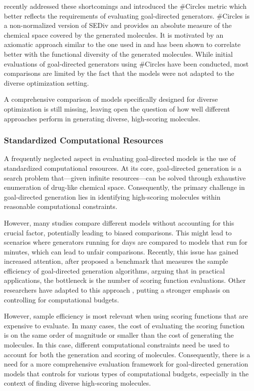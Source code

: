 \citet{xieHowMuchSpace2023} recently addressed these shortcomings and introduced the \#Circles
metric which better reflects the requirements of evaluating goal-directed generators. \#Circles is a
non-normalized version of \ac{SEDiv} and provides an absolute measure of the chemical space covered by
the generated molecules. It is motivated by an axiomatic approach similar to the one used in
\citep{waldmanNovelAlgorithmsOptimization2000} and has been shown to correlate better with the
functional diversity of the generated molecules. While initial evaluations of goal-directed generators using \#Circles have been conducted, most comparisons are limited by the
fact that the models were not adapted to the diverse optimization setting.

A comprehensive
comparison of models specifically designed for diverse optimization is still missing, leaving open
the question of how well different approaches perform in generating diverse, high-scoring molecules.

\subsubsection{Standardized Computational Resources}
A frequently neglected aspect in evaluating goal-directed models is the use of standardized
computational resources. At its core, goal-directed generation is a search problem
that—given infinite resources—can be solved through exhaustive enumeration of drug-like chemical space.
Consequently, the primary challenge in goal-directed generation lies in identifying high-scoring molecules
within reasonable computational constraints.

However, many studies compare different models without accounting for this crucial factor,
potentially leading to biased comparisons. This might lead to scenarios where generators running for
days are compared to models that run for minutes, which can lead to unfair comparisons. Recently,
this issue has gained increased attention, after \citep{gaoSampleEfficiencyMatters2022} proposed a
benchmark that measures the sample efficiency of goal-directed generation algorithms, arguing
that in practical applications, the bottleneck is the number of scoring function evaluations. Other
researchers have adapted to this approach \citep{thomasReevaluatingSampleEfficiency2022,thomasAugmentedHillClimbIncreases2022,guoAugmentedMemoryCapitalizing2023},
putting a stronger emphasis on controlling for computational budgets.

However, sample efficiency is most relevant when using scoring functions that are expensive to
evaluate. In many cases, the cost of evaluating the scoring function is on the same order of
magnitude or smaller than the cost of generating the molecules. In this case, different computational
constraints need be used to account for both the generation and scoring of molecules. Consequently, there is a
need for a more comprehensive evaluation framework for goal-directed generation models that controls
for various types of computational budgets, especially in the context of finding diverse high-scoring
molecules.

